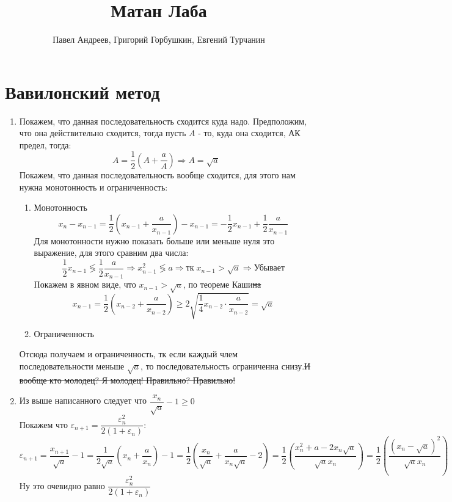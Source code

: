 \documentclass{report}
\title{\Huge{Матан Лаба}}
\author{\huge{Павел Андреев, Григорий Горбушкин, Евгений Турчанин}}
\date{}
\begin{document}
\maketitle

\section{\textbf{Вавилонский метод}}
\begin{enumerate}
    \item Покажем, что данная последовательность сходится куда надо.
    Предположим, что она действительно сходится, тогда пусть $A$ - то, куда она сходится, АК предел, тогда:
    \begin{equation*}
    A=\frac{1}{2}\left(A+\dfrac{a}{A}\right)\Rightarrow A=\sqrt{a}
    \end{equation*}
    Покажем, что данная последовательность вообще сходится, для этого нам нужна монотонность и ограниченность:
    \begin{enumerate}
        \item Монотонность
    \begin{equation*}
        x_n-x_{n-1}=\frac{1}{2}\left(x_{n-1}+\dfrac{a}{x_{n-1}}\right)-x_{n-1}=-\frac{1}{2}x_{n-1}+\frac{1}{2}\dfrac{a}{x_{n-1}}
    \end{equation*}
    Для монотонности нужно показать больше или меньше нуля это выражение, для этого сравним два числа:
    \begin{equation*}
        \frac{1}{2}x_{n-1}\lessgtr\frac{1}{2}\dfrac{a}{x_{n-1}}\Rightarrow x_{n-1}^2\lessgtr a \Rightarrow \text{тк}\;x_{n-1}>\sqrt{a} \Rightarrow \text{Убывает}
    \end{equation*}
            Покажем в явном виде, что $x_{n-1}>\sqrt{a}$, по теореме Каши\sout{на}
            \begin{equation*}
        x_{n-1}=\frac{1}{2}\left(x_{n-2}+\dfrac{a}{x_{n-2}}\right) \geq 2\sqrt{\frac{1}{4}x_{n-2}\cdot\dfrac{a}{x_{n-2}}}=\sqrt{a}
        \end{equation*}
    \item Ограниченность
    \end{enumerate}
    Отсюда получаем и ограниченность, тк если каждый члем последовательности меньше $\sqrt{a}$, то последовательность ограниченна снизу.\sout{И вообще кто молодец? Я молодец! Правильно? Правильно!}

\item Из выше написанного следует что $\dfrac{x_n}{\sqrt{a}}-1\geq 0$\\
    Покажем что $\varepsilon_{n+1}=\dfrac{\varepsilon_n^2}{2(1+\varepsilon_n)}$:
    \begin{equation*}
        \varepsilon_{n+1}=\dfrac{x_{n+1}}{\sqrt{a}}-1=\frac{1}{2\sqrt{a}}\left(x_{n}+\dfrac{a}{x_{n}}\right)-1=
        \frac{1}{2}\left(\dfrac{x_{n}}{\sqrt{a}}+\dfrac{a}{x_{n}\sqrt{a}}-2\right)=
        \frac{1}{2}\left(\dfrac{x_{n}^2+a-2x_n\sqrt{a}}{\sqrt{a}x_n}\right)=
        \frac{1}{2}\left(\dfrac{(x_n-\sqrt a)^2}{\sqrt{a}x_n}\right)
    \end{equation*}
    Ну это очевидно равно $\dfrac{\varepsilon_n^2}{2(1+\varepsilon_n)}$\\
    

\end{enumerate}
\end{document}
